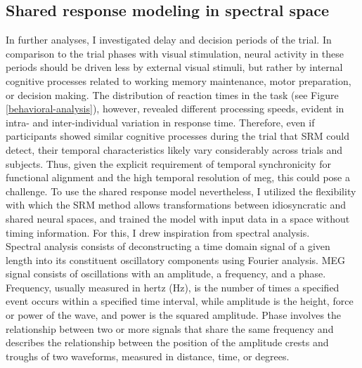 
\subsection{Shared response modeling in spectral space}

In further analyses, I investigated delay and decision periods of the trial.
In comparison to the trial phases with visual stimulation, neural activity in these periods should be driven less by external visual stimuli, but rather by internal cognitive processes related to working memory maintenance, motor preparation, or decision making.
The distribution of reaction times in the task (see Figure \ref{behavioral-analysis}), however, revealed different processing speeds, evident in intra- and inter-individual variation in response time.
Therefore, even if participants showed similar cognitive processes during the trial that \gls{SRM} could detect, their temporal characteristics likely vary considerably across trials and subjects.
Thus, given the explicit requirement of temporal synchronicity for functional alignment and the high temporal resolution of \gls{meg}, this could pose a challenge.
To use the shared response model nevertheless, I utilized the flexibility with which the \gls{SRM} method allows transformations between idiosyncratic and shared neural spaces, and trained the model with input data in a space without timing information.
For this, I drew inspiration from spectral analysis.\\
Spectral analysis consists of deconstructing a time domain signal of a given length into its constituent oscillatory components using Fourier analysis.
MEG signal consists of oscillations with an amplitude, a frequency, and a phase.
Frequency, usually measured in hertz (Hz), is the number of times a specified event occurs within a specified time interval, while amplitude is the height, force or power of the wave, and power is the squared amplitude.
Phase involves the relationship between two or more signals that share the same frequency and describes the relationship between the position of the amplitude crests and troughs of two waveforms, measured in distance, time, or degrees.
